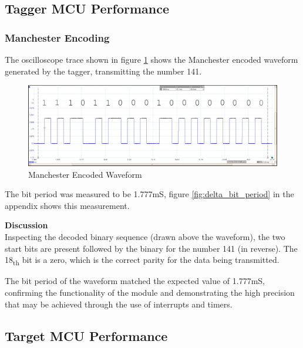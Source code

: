 


\subsection{Tagger MCU Performance}

\subsubsection{Manchester Encoding}
The oscilloscope trace shown in figure \ref{fig:manchester_sequence_141_decoded} shows the Manchester encoded waveform generated by the tagger, transmitting the number 141.

\begin{figure}[H]
	\centering
	\includegraphics[width=.9\textwidth]{figures/results/manchester/manchester_sequence_141_decoded.png}
	\caption{Manchester Encoded Waveform}
	\label{fig:manchester_sequence_141_decoded}
\end{figure}

The bit period was measured to be 1.777mS, figure \ref{fig:delta_bit_period} in the appendix shows this measurement.


\textbf{Discussion}\\
Inspecting the decoded binary sequence (drawn above the waveform), the two start bits are present followed by the binary for the number 141 (in reverse). The 18\textsubscript{th} bit is a zero, which is the correct parity for the data being transmitted.

The bit period of the waveform matched the expected value of 1.777mS, confirming the functionality of the module and demonstrating the high precision that may be achieved through the use of interrupts and timers.






\subsection{Target MCU Performance}


